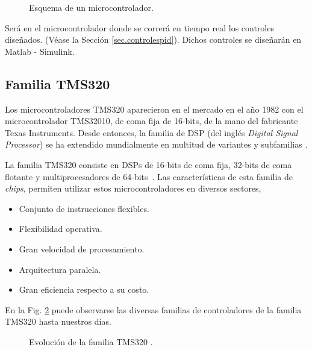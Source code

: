 \documentclass{report}
\begin{document}
\begin{figure}[!h]
    \begin{center}
    \end{center}
    \caption{Esquema de un microcontrolador.}
    \label{fig.esquemamicrocontrolador}
\end{figure}

        

Será en el microcontrolador donde se correrá en tiempo real los controles diseñados. (Véase la Sección \ref{sec.controlespid}). Dichos controles se diseñarán en Matlab - Simulink.

\subsection{Familia TMS320} \label{sec.familiatms320}
Los microcontroladores TMS320 aparecieron en el mercado en el año 1982 con el microcontrolador TMS32010, de coma fija de 16-bits, de la mano del fabricante Texas Instruments. Desde entonces, la familia de DSP (del inglés \textit{Digital Signal Processor}) se ha extendido mundialmente en multitud de variantes y subfamilias \cite{quince}.

La familia TMS320 consiste en DSPs de 16-bits de coma fija, 32-bits de coma flotante y multiprocesadores de 64-bits \cite{dieciseis}. Las características de esta familia de \textit{chips}, permiten utilizar estos microcontroladores en diversos sectores,
\begin{itemize}
    \item Conjunto de instrucciones flexibles.
    \item Flexibilidad operativa.
    \item Gran velocidad de procesamiento.
    \item Arquitectura paralela.
    \item Gran eficiencia respecto a su costo.
\end{itemize}
En la Fig. \ref{fig.evolucionfamiliatms320} puede observarse las diversas familias de controladores de la familia TMS320 hasta nuestros días.

\begin{figure}[!h]
    \begin{center}
    \end{center}
    \caption{Evolución de la familia TMS320 \cite{dieciseis}.}
    \label{fig.evolucionfamiliatms320}
\end{figure}
\end{document}
